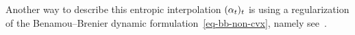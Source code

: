 Another way to describe this entropic interpolation $(\alpha_t)_t$ is using a regularization of the Benamou--Brenier dynamic formulation~\eqref{eq-bb-non-cvx}, namely 
see~\citep{gentil2015analogy,chen2016relation}.




